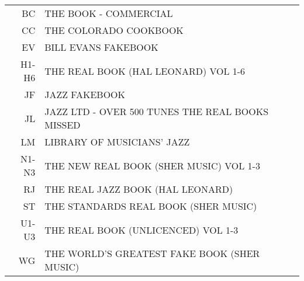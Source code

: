 \documentclass[8pt]{scrartcl}
\begin{document}
\selectfont
\begin{center}
  \begin{tabular}{r@{\quad=\quad}l}%
    BC    & THE BOOK - COMMERCIAL\\
    CC    & THE COLORADO COOKBOOK\\
    EV    & BILL EVANS FAKEBOOK\\
    H1-H6 & THE REAL BOOK (HAL LEONARD) VOL 1-6\\
    JF    & JAZZ FAKEBOOK\\
    JL    & JAZZ LTD - OVER 500 TUNES THE REAL BOOKS MISSED\\
    LM    & LIBRARY OF MUSICIANS’ JAZZ\\
    N1-N3 & THE NEW REAL BOOK (SHER MUSIC) VOL 1-3\\
    RJ    & THE REAL JAZZ BOOK (HAL LEONARD)\\
    ST    & THE STANDARDS REAL BOOK (SHER MUSIC)\\
    U1-U3 & THE REAL BOOK (UNLICENCED) VOL 1-3\\
    WG    & THE WORLD'S GREATEST FAKE BOOK (SHER MUSIC)\\
  \end{tabular}
\end{center}

\begin{multicols}{3}
  \raggedright
  
\end{multicols}
\end{document}

